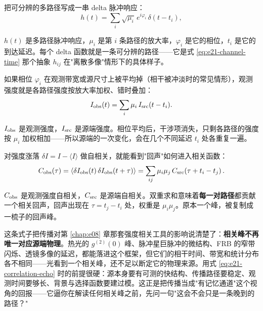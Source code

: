 把可分辨的多路径写成一串 delta 脉冲响应：
\begin{equation}
  h(t)=\sum_i \sqrt{\mu_i}\,e^{i\varphi_i}\,\delta(t-t_i),
  \label{eq:e21-multipath-impulse}
\end{equation}
\begin{formulaexplain}
\(h(t)\) 是多路径脉冲响应，\(\mu_i\) 是第 \(i\) 条路径的放大率，\(\varphi_i\) 是它的相位，\(t_i\) 是它的到达延迟。每个 delta 函数就是一条可分辨的路径——它是式 \eqref{eq:e21-channel-time} 那个抽象 \(h_{ij}\) 在"离散多像"情形下的具体样子。
\end{formulaexplain}
如果相位 \(\varphi_i\) 在观测带宽或源尺寸上被平均掉（相干被冲淡时的常见情形），观测强度就是各路径强度按放大率加权、错时叠加：
\begin{equation}
  I_{\rm obs}(t)
  =
  \sum_i \mu_i\,I_{\rm src}(t-t_i).
  \label{eq:e21-multipath-intensity}
\end{equation}
\begin{formulaexplain}
\(I_{\rm obs}\) 是观测强度，\(I_{\rm src}\) 是源端强度。相位平均后，干涉项消失，只剩各路径的强度按 \(\mu_i\) 加权相加——所以源端的一次变化，会在几个不同延迟 \(t_i\) 处各重复一遍。
\end{formulaexplain}
对强度涨落 \(\delta I=I-\langle I\rangle\) 做自相关，就能看到"回声"如何进入相关函数：
\begin{equation}
  C_{\rm obs}(\tau)
  =
  \left\langle
  \delta I_{\rm obs}(t)\,
  \delta I_{\rm obs}(t+\tau)
  \right\rangle
  =
  \sum_{ij}\mu_i\mu_j\,
  C_{\rm src}\!\left(\tau+t_i-t_j\right).
  \label{eq:e21-correlation-echo}
\end{equation}
\begin{formulaexplain}
\(C_{\rm obs}\) 是观测强度自相关，\(C_{\rm src}\) 是源端自相关。双重求和意味着\textbf{每一对路径}都贡献一个相关回声，回声出现在 \(\tau=t_j-t_i\) 处，权重是 \(\mu_i\mu_j\)。原本一个峰，被复制成一梳子的回声峰。
\end{formulaexplain}
这条式子把传播对第 \ref{chap:e08} 章那套强度相关工具的影响说清楚了：\textbf{相关峰不再唯一对应源端物理}。热光的 \(g^{(2)}(0)\) 峰、脉冲星巨脉冲的微结构、FRB 的窄带闪烁、透镜多像的延迟，都能落进这个框架，但它们的相干时间、带宽和统计分布各不相同——光看到一个相关峰，还不足以断定它的物理来源。用式 \eqref{eq:e21-correlation-echo} 时的前提很硬：源本身要有可测的快结构、传播路径要稳定、观测时间要够长、背景与选择函数要建过模。这正是把传播当成"有记忆通道"这个视角的回报——它逼你在解读任何相关峰之前，先问一句"这会不会只是一条晚到的路径？"

